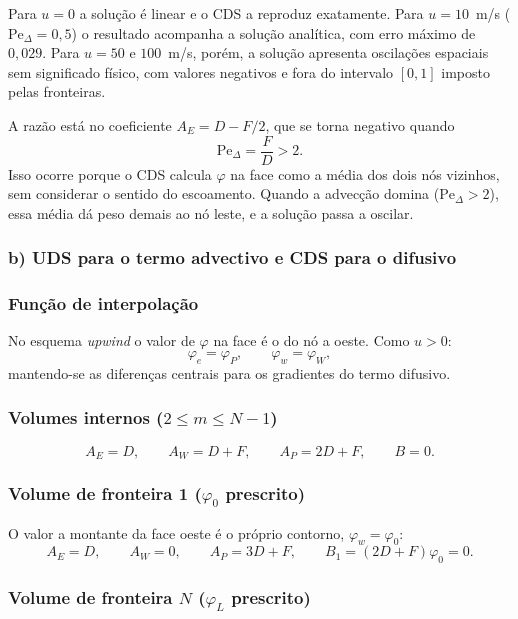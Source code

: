 Para $u=0$ a solução é linear e o CDS a reproduz exatamente. Para $u=10$~m/s
($\mathrm{Pe}_{\Delta}=0{,}5$) o resultado acompanha a solução analítica, com
erro máximo de $0{,}029$. Para $u=50$ e $100$~m/s, porém, a solução apresenta
oscilações espaciais sem significado físico, com valores negativos e fora do
intervalo $[0,1]$ imposto pelas fronteiras.

A razão está no coeficiente $A_E=D-F/2$, que se torna negativo quando
\[
  \mathrm{Pe}_{\Delta}=\frac{F}{D}>2 .
\]
Isso ocorre porque o CDS calcula $\varphi$ na face como a média dos dois nós vizinhos, sem considerar o sentido do escoamento. Quando a advecção domina ($\mathrm{Pe}_{\Delta}>2$), essa média dá peso demais ao nó leste, e a solução passa a oscilar.

\vspace{0.5cm}

\subsubsection*{b) UDS para o termo advectivo e CDS para o difusivo}

\subsubsection*{Função de interpolação}

No esquema \emph{upwind} o valor de $\varphi$ na face é o do nó a oeste.
Como $u>0$:
\[
  \varphi_e=\varphi_P,\qquad \varphi_w=\varphi_W ,
\]
mantendo-se as diferenças centrais para os gradientes do termo difusivo.

\subsubsection*{Volumes internos ($2\le m\le N-1$)}
\[
  A_E=D,\qquad
  A_W=D+F,\qquad
  A_P=2D+F,\qquad
  B=0 .
\]

\subsubsection*{Volume de fronteira 1 ($\varphi_0$ prescrito)}

O valor a montante da face oeste é o próprio contorno, $\varphi_w=\varphi_0$:
\[
  A_E=D,\qquad
  A_W=0,\qquad
  A_P=3D+F,\qquad
  B_1=\left(2D+F\right)\varphi_0=0 .
\]

\subsubsection*{Volume de fronteira $N$ ($\varphi_L$ prescrito)}

